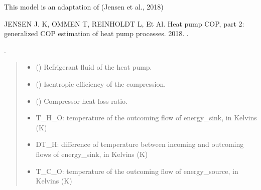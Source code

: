\documentclass[letterpaper,10pt,english]{sphinxmanual}
\begin{document}
\begin{fulllineitems}
\begin{fulllineitems}
\sphinxAtStartPar
This model is an adaptation of (Jensen et al., 2018) %
\begin{footnote}[1]\sphinxAtStartFootnote
JENSEN J. K, OMMEN T, REINHOLDT L, Et Al. Heat pump COP, part 2: generalized COP estimation of heat pump processes.
2018. .
%
\end{footnote}.
\begin{quote}\begin{description}
\begin{itemize}
\item {} 
\sphinxAtStartPar
{} (\sphinxstyleliteralemphasis{\sphinxupquote{, }}\sphinxstyleliteralemphasis{\sphinxupquote{, }}\sphinxstyleliteralemphasis{\sphinxupquote{, }}) \textendash{} Refrigerant fluid of the heat pump.

\item {} 
\sphinxAtStartPar
{} (\sphinxstyleliteralemphasis{\sphinxupquote{, }}) \textendash{} Isentropic efficiency of the compression.

\item {} 
\sphinxAtStartPar
{} (\sphinxstyleliteralemphasis{\sphinxupquote{, }}) \textendash{} Compressor heat loss ratio.

\end{itemize}

\sphinxAtStartPar
\begin{itemize}
\item {} 
\sphinxAtStartPar
T\_H\_O: temperature of the outcoming flow of energy\_sink, in Kelvins (K)

\item {} 
\sphinxAtStartPar
DT\_H: difference of temperature between incoming and outcoming flows of energy\_sink, in Kelvins (K)

\item {} 
\sphinxAtStartPar
T\_C\_O: temperature of the outcoming flow of energy\_source, in Kelvins (K)


\end{itemize}
\end{description}
\end{quote}
\end{fulllineitems}
\end{fulllineitems}
\end{document}
